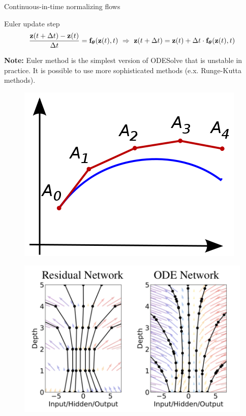 \begin{frame}{Continuous-in-time normalizing flows}
	\begin{block}{Euler update step}
		\vspace{-0.5cm}
		\[
		    \frac{\mathbf{z}(t + \Delta t) - \mathbf{z}(t)}{\Delta t} = \mathbf{f}_{\boldsymbol{\theta}}(\mathbf{z}(t), t) \,\, \Rightarrow \,\, \mathbf{z}(t + \Delta t) = \mathbf{z}(t) + \Delta t \cdot \mathbf{f}_{\boldsymbol{\theta}}(\mathbf{z}(t), t)
		\]
		\vspace{-0.5cm}
	\end{block}
	\textbf{Note:} Euler method is the simplest version of ODESolve that is unstable in practice.  It is possible to use more sophisticated methods (e.x. Runge-Kutta methods).
	\begin{minipage}[t]{0.4\columnwidth}
		\begin{figure}
			\centering
			\includegraphics[width=0.7\linewidth]{figs/euler}
		\end{figure}
	\end{minipage}%
	\begin{minipage}[t]{0.6\columnwidth}
		\vspace{-0.2cm}
		\begin{figure}
			\centering
			\includegraphics[width=0.9\linewidth]{figs/resnet_vs_neural_ode.png}
		\end{figure}
	\end{minipage}
	

\end{frame}
